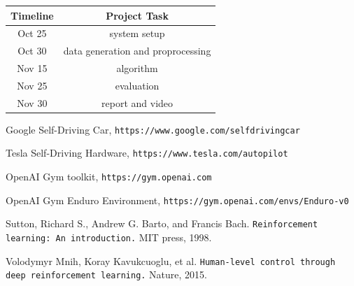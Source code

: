 \documentclass[a4paper]{article}
\begin{document}
\begin{center}
    \begin{tabular}{ | c | c |  } 
        \hline
        Timeline & Project Task    \\ 
        \hline
        Oct 25   & system setup    \\ 
        \hline
        Oct 30   & data generation and proprocessing    \\ 
        \hline
        Nov 15   & algorithm     \\ 
        \hline
        Nov 25   & evaluation     \\ 
        \hline
        Nov 30   & report and video     \\ 
        \hline
    \end{tabular}
\end{center}




\begin{thebibliography}{9}
  Google Self-Driving Car, \texttt{https://www.google.com/selfdrivingcar}

  Tesla Self-Driving Hardware, \texttt{https://www.tesla.com/autopilot}

  OpenAI Gym toolkit, \texttt{https://gym.openai.com}

  OpenAI Gym Enduro Environment, \texttt{https://gym.openai.com/envs/Enduro-v0}

    Sutton, Richard S., Andrew G. Barto, and Francis Bach. \texttt{Reinforcement learning: An introduction.} MIT press, 1998.

  Volodymyr Mnih, Koray Kavukcuoglu, et al. \texttt{Human-level control through deep reinforcement learning.} Nature, 2015.

\end{thebibliography}
\end{document}
